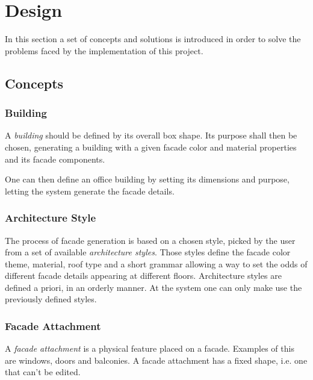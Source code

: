 \chapter{Design}

In this section a set of concepts and solutions is introduced in order to solve the problems faced
by the implementation of this project.




\section{Concepts}


\subsection{Building}

A \emph{building} should be defined by its overall box shape.
Its purpose shall then be chosen, generating a building
with a given facade color and material properties and
its facade components.

One can then define an office building by setting its dimensions
and purpose, letting the system generate the facade details.


\subsection{Architecture Style}

The process of facade generation is based on a chosen style,
picked by the user from a set of available \emph{architecture styles}.
Those styles define the facade color theme, material, roof type and 
a short grammar allowing a way to set the odds of different facade details appearing
at different floors.
Architecture styles are defined a priori, in an orderly manner.
At the system one can only make use the previously defined styles.



\subsection{Facade Attachment}

A \emph{facade attachment} is a physical feature placed on a facade.
Examples of this are windows, doors and balconies.
A facade attachment has a fixed shape, i.e. one that can't be edited.

